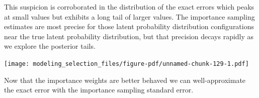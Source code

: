 \documentclass[
  letterpaper,
  DIV=11,
  numbers=noendperiod]{scrartcl}
\newenvironment{Shaded}{\begin{snugshade}}{\end{snugshade}}
\newcommand{\AttributeTok}[1]{\textcolor[rgb]{0.40,0.45,0.13}{#1}}
\newcommand{\DecValTok}[1]{\textcolor[rgb]{0.68,0.00,0.00}{#1}}
\newcommand{\FunctionTok}[1]{\textcolor[rgb]{0.28,0.35,0.67}{#1}}
\newcommand{\NormalTok}[1]{\textcolor[rgb]{0.00,0.23,0.31}{#1}}
\newcommand{\SpecialCharTok}[1]{\textcolor[rgb]{0.37,0.37,0.37}{#1}}
\newcommand{\StringTok}[1]{\textcolor[rgb]{0.13,0.47,0.30}{#1}}
\begin{document}
This suspicion is corroborated in the distribution of the exact errors
which peaks at small values but exhibits a long tail of larger values.
The importance sampling estimates are most precise for those latent
probability distribution configurations near the true latent probability
distribution, but that precision decays rapidly as we explore the
posterior tails.

\begin{Shaded}
\end{Shaded}

\texttt{[image: modeling\_selection\_files/figure-pdf/unnamed-chunk-129-1.pdf]}

Now that the importance weights are better behaved we can
well-approximate the exact error with the importance sampling standard
error.
\end{document}
